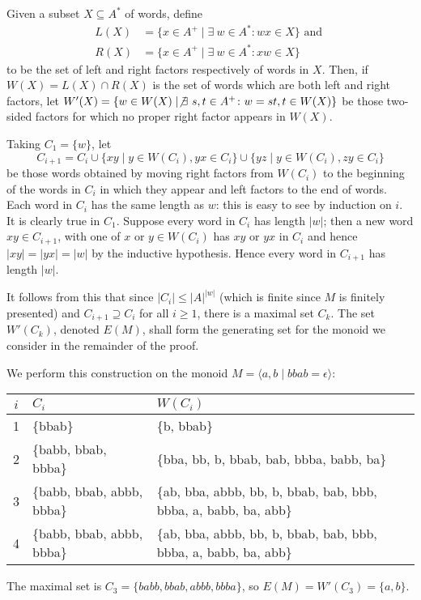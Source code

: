 \documentclass[11pt,libertine,widepage,nosubthm]{lmaths}
\begin{document}
Given a subset $X \subseteq A^*$ of words, define
	\begin{align*}
		L(X) &= \{ x \in A^+ \mid \exists\ w \in A^* \colon wx \in X \} \text{ and } \\
		R(X) &= \{ x \in A^+ \mid \exists\ w \in A^* \colon xw \in X \}
	\end{align*}
to be the set of left and right factors respectively of words in $X$. Then, if $W(X) = L(X) \cap R(X)$ is the set of words which are both left and right factors, let $W'(X) = \{ w \in W(X) \mid \not\exists\ s, t \in A^+ \colon w = st, t \in W(X) \}$ be those two-sided factors for which no proper right factor appears in $W(X)$.

Taking $C_1 = \{w\}$, let
	\[ C_{i+1} = C_i \cup \{ xy \mid y \in W(C_i), yx \in C_i \} \cup \{ yz \mid y \in W(C_i), zy \in C_i \} \]
be those words obtained by moving right factors from $W(C_i)$ to the beginning of the words in $C_i$ in which they appear and left factors to the end of words. Each word in $C_i$ has the same length as $w$: this is easy to see by induction on $i$. It is clearly true in $C_1$. Suppose every word in $C_i$ has length $|w|$; then a new word $xy \in C_{i+1}$, with one of $x$ or $y \in W(C_i)$ has $xy$ or $yx$ in $C_i$ and hence $|xy| = |yx| = |w|$ by the inductive hypothesis. Hence every word in $C_{i+1}$ has length $|w|$.

It follows from this that since $|C_i| \le |A|^{|w|}$ (which is finite since $M$ is finitely presented) and $C_{i+1} \supseteq C_i$ for all $i \ge 1$, there is a maximal set $C_k$. The set $W'(C_k)$, denoted $E(M)$, shall form the generating set for the monoid we consider in the remainder of the proof.

\begin{example}
	We perform this construction on the monoid $M = \langle a, b \mid bbab = \epsilon \rangle$:

	\begin{center}
	\begin{tabular}{c|ll}
		$i$ & $C_i$ & $W(C_i)$ \\
		\hline
		1 & \{bbab\} & \{b, bbab\} \\
		2 & \{babb, bbab, bbba\} & \{bba, bb, b, bbab, bab, bbba, babb, ba\} \\
		3 & \{babb, bbab, abbb, bbba\} & \{ab, bba, abbb, bb, b, bbab, bab, bbb, bbba, a, babb, ba, abb\} \\
		4 & \{babb, bbab, abbb, bbba\} & \{ab, bba, abbb, bb, b, bbab, bab, bbb, bbba, a, babb, ba, abb\}
	\end{tabular}
	\end{center}

	The maximal set is $C_3 = \{babb, bbab, abbb, bbba\}$, so $E(M) = W'(C_3) = \{a, b\}$.
\end{example}
\end{document}
